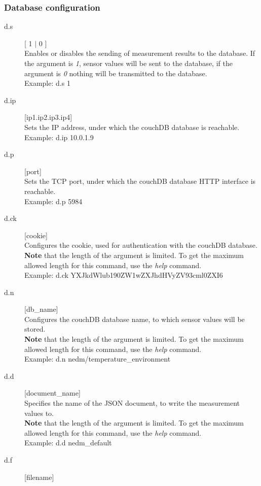 \documentclass[a4paper]{scrreprt}
\begin{document}
\subsubsection{Database configuration}
\begin{description}
  \item[d.s] [ 1 $|$ 0 ]\\
    Enables or disables the sending of measurement results to the database. If the
    argument is \emph{1}, sensor values will be sent to the database, if the argument
    is \emph{0} nothing will be transmitted to the database.\\
    Example: d.s 1
  \item[d.ip] [ip1.ip2.ip3.ip4]\\
    Sets the IP address, under which the couchDB database is reachable.\\
    Example: d.ip 10.0.1.9
  \item[d.p] [port]\\
    Sets the TCP port, under which the couchDB database HTTP interface is reachable.\\
    Example: d.p 5984
  \item[d.ck] [cookie]\\
    Configures the cookie, used for authentication with the couchDB database.\\
    \textbf{Note} that the length of the argument is limited. To get the maximum allowed
    length for this command, use the \emph{help} command.\\
    Example: d.ck YXJkdWlub190ZW1wZXJhdHVyZV93cml0ZXI6
  \item[d.n] [db\_name]\\
    Configures the couchDB database name, to which sensor values will be stored.\\
    \textbf{Note} that the length of the argument is limited. To get the maximum allowed
    length for this command, use the \emph{help} command.\\
    Example: d.n nedm/temperature\_environment
  \item[d.d] [document\_name]\\
    Specifies the name of the JSON document, to write the measurement values to.\\
    \textbf{Note} that the length of the argument is limited. To get the maximum allowed
    length for this command, use the \emph{help} command.\\
    Example: d.d nedm\_default
  \item[d.f] [filename]\\

\end{description}
\end{document}
